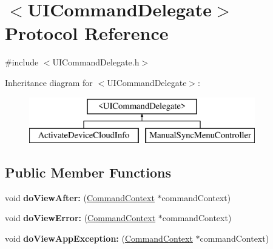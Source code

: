 \hypertarget{protocol_u_i_command_delegate-p}{
\section{$<$\-U\-I\-Command\-Delegate$>$ \-Protocol \-Reference}
\label{protocol_u_i_command_delegate-p}
}


{\ttfamily \#include $<$\-U\-I\-Command\-Delegate.\-h$>$}

\-Inheritance diagram for $<$\-U\-I\-Command\-Delegate$>$\-:\begin{figure}[H]
\begin{center}
\leavevmode
\includegraphics[height=2.000000cm]{protocol_u_i_command_delegate-p}
\end{center}
\end{figure}
\subsection*{\-Public \-Member \-Functions}
\begin{DoxyCompactItemize}
\item 
\hypertarget{protocol_u_i_command_delegate-p_af12c12d06917a2cedc824890d61ea60a}{
void {\bfseries do\-View\-After\-:} (\hyperlink{interface_command_context}{\-Command\-Context} $\ast$command\-Context)}
\label{protocol_u_i_command_delegate-p_af12c12d06917a2cedc824890d61ea60a}

\item 
\hypertarget{protocol_u_i_command_delegate-p_a8837f2cb5bfa7caec4d9dc0485d71cb1}{
void {\bfseries do\-View\-Error\-:} (\hyperlink{interface_command_context}{\-Command\-Context} $\ast$command\-Context)}
\label{protocol_u_i_command_delegate-p_a8837f2cb5bfa7caec4d9dc0485d71cb1}

\item 
\hypertarget{protocol_u_i_command_delegate-p_a5eadaca8d36c063d5dba1b282d7b0ac3}{
void {\bfseries do\-View\-App\-Exception\-:} (\hyperlink{interface_command_context}{\-Command\-Context} $\ast$command\-Context)}
\label{protocol_u_i_command_delegate-p_a5eadaca8d36c063d5dba1b282d7b0ac3}

\end{DoxyCompactItemize}


